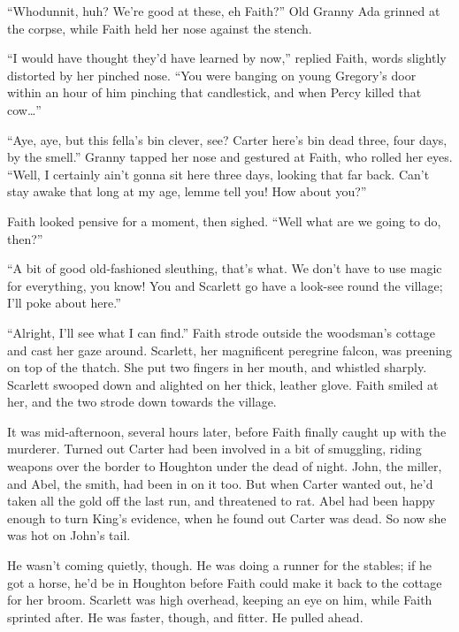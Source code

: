 
``Whodunnit, huh?
We're good at these, eh Faith?''
Old Granny Ada grinned at the corpse, while Faith held her nose against the stench.

``I would have thought they'd have learned by now,''
replied Faith, words slightly distorted by her pinched nose.
``You were banging on young Gregory's door within an hour of him pinching that candlestick, and when Percy killed that cow{\dots}''

``Aye, aye, but this fella's bin clever, see?
Carter here's bin dead three, four days, by the smell.''
Granny tapped her nose and gestured at Faith, who rolled her eyes.
``Well, I certainly ain't gonna sit here three days, looking that far back.
Can't stay awake that long at my age, lemme tell you!
How about you?''

Faith looked pensive for a moment, then sighed.
``Well what are we going to do, then?''

``A bit of good old-fashioned sleuthing, that's what.
We don't have to use magic for everything, you know!
You and Scarlett go have a look-see round the village;
I'll poke about here.''

\newcommand\foretellingstoryrepeat{%
	``Alright, I'll see what I can find.''
	Faith strode outside the woodsman's cottage and cast her gaze around.
	Scarlett, her magnificent peregrine falcon, was preening on top of the thatch.
	She put two fingers in her mouth,
}%
{\foretellingstoryrepeat}
and whistled sharply.
Scarlett swooped down and alighted on her thick, leather glove.
Faith smiled at her, and the two strode down towards the village.

\storybreak

It was mid-afternoon, several hours later, before Faith finally caught up with the murderer.
Turned out Carter had been involved in a bit of smuggling, riding weapons over the border to Houghton under the dead of night.
John, the miller, and Abel, the smith, had been in on it too.
But when Carter wanted out, he'd taken all the gold off the last run, and threatened to rat.
Abel had been happy enough to turn King's evidence, when he found out Carter was dead.
So now she was hot on John's tail.

He wasn't coming quietly, though.
He was doing a runner for the stables; if he got a horse, he'd be in Houghton before Faith could make it back to the cottage for her broom.
Scarlett was high overhead, keeping an eye on him, while Faith sprinted after.
He was faster, though, and fitter.
He pulled ahead.

